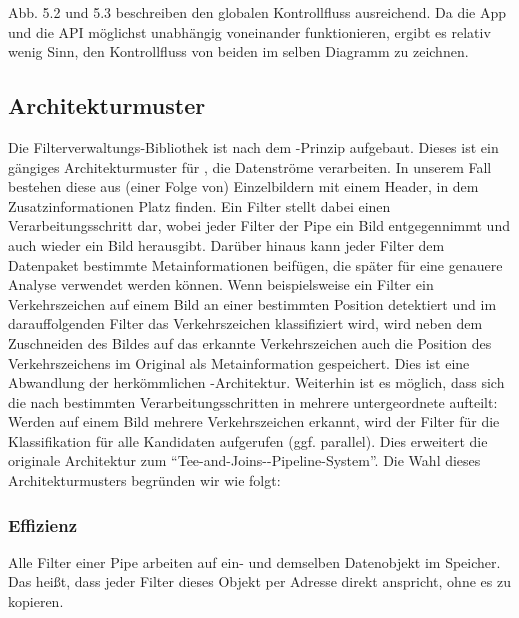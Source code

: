 \documentclass[12pt,a4paper,ngerman,enabledeprecatedfontcommands]{scrreprt}
\begin{document}
Abb. 5.2 und 5.3 beschreiben den globalen Kontrollfluss ausreichend. Da die \gls{App} und die \gls{API} möglichst unabhängig voneinander funktionieren, ergibt es relativ wenig Sinn, den Kontrollfluss von beiden im selben Diagramm zu zeichnen.\\


\subsection{Architekturmuster}

Die  \gls{Filterverwaltungs-Bibliothek}  ist nach dem -Prinzip aufgebaut. Dieses ist ein gängiges Architekturmuster für , die Datenströme verarbeiten. In unserem Fall bestehen diese aus (einer Folge von) Einzelbildern mit einem Header, in dem Zusatzinformationen Platz finden. 
Ein \gls{Filter} stellt dabei einen Verarbeitungsschritt dar, wobei jeder \gls{Filter} der \gls{Pipe} ein Bild entgegennimmt und auch wieder ein Bild herausgibt. Darüber hinaus kann jeder \gls{Filter} dem Datenpaket bestimmte Metainformationen beifügen, die später für eine genauere Analyse verwendet werden können. Wenn beispielsweise ein \gls{Filter} ein Verkehrszeichen auf einem Bild an einer bestimmten Position detektiert und im darauffolgenden \gls{Filter} das Verkehrszeichen klassifiziert wird, wird neben dem Zuschneiden des Bildes auf das erkannte Verkehrszeichen auch die Position des Verkehrszeichens im Original als Metainformation gespeichert. Dies ist eine Abwandlung der herkömmlichen -Architektur.
Weiterhin ist es möglich, dass sich die  nach bestimmten Verarbeitungsschritten in mehrere untergeordnete  aufteilt: Werden auf einem Bild mehrere Verkehrszeichen erkannt, wird der \gls{Filter} für die \gls{Klassifikation}  für alle Kandidaten aufgerufen (ggf. parallel). Dies erweitert die originale Architektur zum “Tee-and-Joins--Pipeline-System”.
Die Wahl dieses Architekturmusters begründen wir wie folgt:

\subsubsection{Effizienz}
Alle \gls{Filter} einer \gls{Pipe} arbeiten auf ein- und demselben Datenobjekt im Speicher. Das heißt, dass jeder \gls{Filter} dieses Objekt per Adresse direkt anspricht, ohne es zu  kopieren. 
\end{document}
